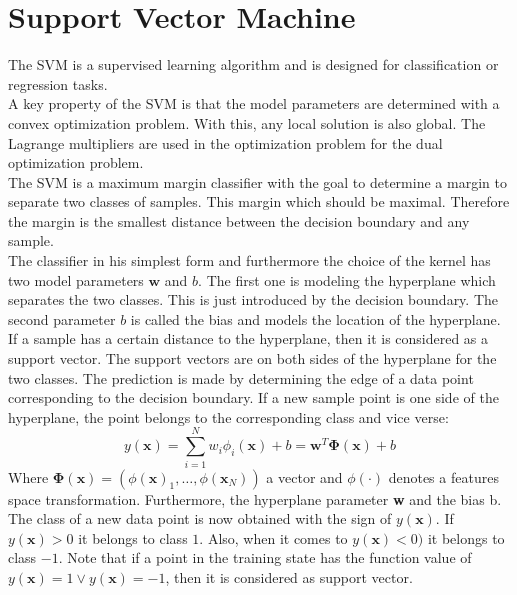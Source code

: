 \section{Support Vector Machine}\label{PcSecSVM}
The \ac{SVM} is a supervised learning algorithm and is designed for classification or regression tasks.\cite[p. 325]{Bishop.2009}\\
A key property of the \acs{SVM} is that the model parameters are determined with a convex optimization problem.
With this, any local solution is also global.
The Lagrange multipliers are used in the optimization problem for the dual optimization problem.\cite[p. 328-239]{Bishop.2009}\\
The \acs{SVM} is a maximum margin classifier with the goal to determine a margin to separate two classes of samples. This margin which should be maximal. 
Therefore the margin is the smallest distance between the decision boundary and any sample.\cite[p. 327]{Bishop.2009}\\
The classifier in his simplest form and furthermore the choice of the kernel has two model parameters $\mathbf{w}$ and $b$. 
The first one is modeling the hyperplane which separates the two classes.
This is just introduced by the decision boundary. 
The second parameter $b$ is called the bias and models the location of the hyperplane.\cite[p. 327-328]{Bishop.2009}\\
If a sample has a certain distance to the hyperplane, then it is considered as a support vector.
The support vectors are on both sides of the hyperplane for the two classes.
The prediction is made by determining the edge of a data point corresponding to the decision boundary.
If a new sample point is one side of the hyperplane, the point belongs to the corresponding class and vice verse:\cite[p. 236;328]{Bishop.2009}
\begin{equation}\label{EqSVMPred}
y(\textbf{x}) = \sum_{i=1}^{N} w_i \phi_i(\mathbf{x}) + b= \textbf{w}^T \mathbf{\Phi}(\textbf{x}) + b
\end{equation}
Where $\mathbf{\Phi(x)}= (\phi(\mathbf{x})_1,\dots,\phi(\mathbf{x}_N))$ a vector and $\phi(\cdot)$ denotes a features space transformation.
Furthermore, the hyperplane parameter \textbf{w} and the bias b.
The class of a new data point is now obtained with the sign of $y(\textbf{x})$. If $y(\textbf{x}) > 0$ it belongs to class $1$.
Also, when it comes to $y(\textbf{x}) < 0)$ it belongs to class $-1$.
Note that if a point in the training state has the function value of $y(\textbf{x}) = 1 \vee y(\textbf{x}) = -1$, then it is considered as support vector.\cite[p. 237]{Bishop.2009}\\
